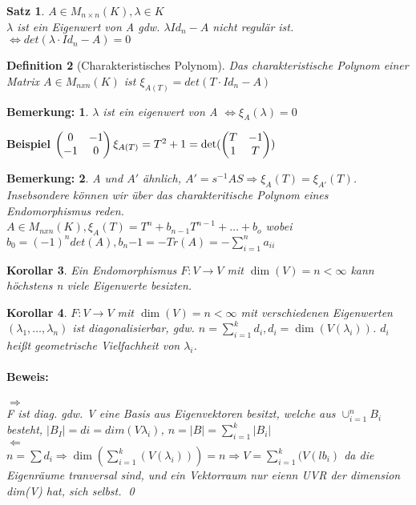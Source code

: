 \documentclass{report}
\newcommand{\lb}{\lambda}
\theoremstyle{customrem}
\newtheorem*{bemerkung}{Bemerkung\textnormal:}
\theoremstyle{customdef}
\newtheorem{definition}{Definition}[chapter]
\newtheorem{korrolar}[definition]{Korollar}
\newtheorem{satz}[definition]{Satz}
\renewenvironment{proof}{\paragraph{Beweis: }}{\qed}
\theoremstyle{customenv}
\begin{document}
\begin{satz}
  \(A \in M_{n\times n}(K), \lb \in K\)\\
  \(\lb\) ist ein Eigenwert von A gdw. \(\lb Id_n - A\) nicht regul\"ar ist.
  \(\Leftrightarrow det(\lb \cdot Id_n -A) = 0\)
\end{satz}

\begin{definition}[Charakteristisches Polynom]
  Das charakteristische Polynom einer Matrix \(A \in M_{nxn}(K)\) ist 
  \(\xi_{A(T)} = det(T \cdot Id_n - A)\)
\end{definition}

\begin{bemerkung}
  \(\lb\) ist ein eigenwert von A \(\Leftrightarrow \xi_A(\lb) = 0\)
\end{bemerkung}

\textbf{Beispiel}
\(
  \begin{pmatrix}
   0 & -1\\
   -1 & 0
  \end{pmatrix}\\
  \xi_{A(T)} = T^2 + 1 = \det(
  \begin{pmatrix}
    T & -1\\
    1 & T
  \end{pmatrix}
  )
\)

\begin{bemerkung}
  A und \(A'\) \"ahnlich, \(A' = s^{-1}AS \Rightarrow \xi_A(T) = \xi_{A'}(T)\).
  Insebsondere k\"onnen wir \"uber das charakteritische Polynom eines
  Endomorphismus reden.\\
  \(A \in M_{nxn}(K), \xi_A(T) = T^n + b_{n-1} T^{n-1} + \dots + b_o\) wobei
  \(b_0 = (-1)^n det(A), b_n{-1} = - Tr(A) = - \sum_{i=1}^n a_{ii}\)
\end{bemerkung}

\begin{korrolar}
  Ein Endomorphismus \(F : V \to V\) mit \(\dim(V) = n < \infty\) kann
  h\"ochstens n viele Eigenwerte besizten.
\end{korrolar}

\begin{korrolar}
  \(F : V \to V\) mit \(\dim(V) = n < \infty\) mit verschiedenen Eigenwerten
  \((\lb_1, \dots, \lb_n)\) ist diagonalisierbar,  gdw. 
  \(n = \sum_{i=1}^k d_i, d_i = \dim(V(\lb_i))\). \(d_i\) hei\ss{}t geometrische
  Vielfachheit von \(\lb_i\).
  
  \begin{proof} \hfill\break
  \(\Rightarrow\)\\
  F ist diag. gdw. V eine Basis aus Eigenvektoren besitzt, welche aus
  \(\cup_{i=1}^n B_i\) besteht, \(|B_I| = di = dim(V\lb_i)\),
  \(n = |B| = \sum_{i=1}^k |B_i|\)\\
  \(\Leftarrow\)\\
    \(n = \sum d_i \Rightarrow \dim(\sum_{i=1}^k (V(\lb_i))) = n
    \Rightarrow V = \sum_{i=1}^k(V(lb_i)\) da die Eigenr\"aume tranversal sind,
     und ein Vektorraum nur eienn UVR der dimension dim(V) hat, sich selbst.
  \end{proof}
\end{korrolar}

\newpage
\renewcommand{\listtheoremname}{Satz- und Definitionsverzeichnis}
\newpage
\printindex
\end{document}
